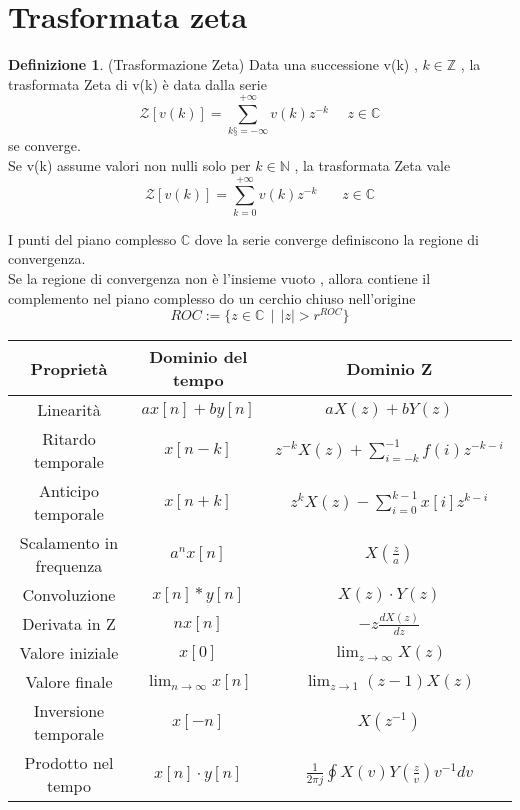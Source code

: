 \documentclass{article}
\theoremstyle{definition}
\newtheorem*{definizione}{Definizione}
\newcommand{\C}{\mathbb{C}}
\renewcommand{\arraystretch}{1.5} %
\begin{document}
\section{Trasformata zeta}
	\begin{definizione}(Trasformazione Zeta)
	Data una successione v(k) , $k \in \mathbb{Z}$ , la trasformata Zeta di v(k) è data dalla serie 
	$$\mathcal{Z}[v(k)]=\sum_{k§=-\infty}^{+\infty}v(k)z^{-k} \ \ \ \ \ \ z \in \C$$ se converge.\\
	Se v(k) assume valori non nulli solo per $k\in\mathbb{N}$ , la trasformata Zeta vale 
	$$\mathcal{Z}[v(k)]=\sum_{k=0}^{+\infty}v(k)z^{-k } \ \ \ \ \ \ \ \ z \in \C$$
	
	\end{definizione}
I punti del piano complesso $\C$ dove la serie converge definiscono la regione di convergenza. \\ Se la regione di convergenza non è l'insieme vuoto , allora contiene il complemento nel piano complesso do un cerchio chiuso nell'origine 
$$ROC := \{z\in\C \ \ |\ \ |z|>r^{ROC} \}$$
\begin{center}
	\renewcommand{\arraystretch}{1.5}
	\begin{tabular}{|c|c|c|}
		\hline
		\textbf{Proprietà} & \textbf{Dominio del tempo} & \textbf{Dominio Z} \\ 
		\hline
		Linearità & $a x[n] + b y[n]$ & $a X(z) + b Y(z)$ \\
		\hline
		Ritardo temporale & $x[n - k]$ & $z^{-k}X(z)+\sum_{i=-k}^{-1}f(i)z^{-k-i}$ \\
		\hline
		Anticipo temporale & $x[n + k]$ & $z^{k}X(z) - \sum_{i=0}^{k-1} x[i]z^{k-i}$ \\
		\hline
		Scalamento in frequenza & $a^n x[n]$ & $X\left(\frac{z}{a}\right)$ \\
		\hline
		Convoluzione & $x[n] * y[n]$ & $X(z) \cdot Y(z)$ \\
		\hline
		Derivata in Z & $n x[n]$ & $-z \frac{dX(z)}{dz}$ \\
		\hline
		Valore iniziale & $x[0]$ & $\lim_{z \to \infty} X(z)$ \\
		\hline
		Valore finale & $\lim_{n \to \infty} x[n]$ & $\lim_{z \to 1} (z-1)X(z)$ \\
		\hline
		Inversione temporale & $x[-n]$ & $X(z^{-1})$ \\
		\hline
		Prodotto nel tempo & $x[n] \cdot y[n]$ & $\frac{1}{2\pi j} \oint X(v) Y\left(\frac{z}{v}\right) v^{-1} dv$ \\
		\hline
	\end{tabular}
\end{center}
\end{document}
